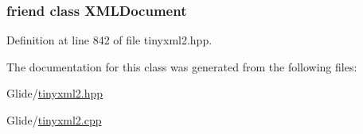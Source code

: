 \hypertarget{classtinyxml2_1_1_x_m_l_text_a4eee3bda60c60a30e4e8cd4ea91c4c6e}{
\subsubsection[{X\-M\-L\-Document}]{\setlength{\rightskip}{0pt plus 5cm}friend class {\bf X\-M\-L\-Document}\hspace{0.3cm}{\ttfamily [friend]}}}\label{classtinyxml2_1_1_x_m_l_text_a4eee3bda60c60a30e4e8cd4ea91c4c6e}


Definition at line 842 of file tinyxml2.\-hpp.



The documentation for this class was generated from the following files\-:\begin{DoxyCompactItemize}
\item 
Glide/\hyperlink{tinyxml2_8hpp}{tinyxml2.\-hpp}\item 
Glide/\hyperlink{tinyxml2_8cpp}{tinyxml2.\-cpp}\end{DoxyCompactItemize}
